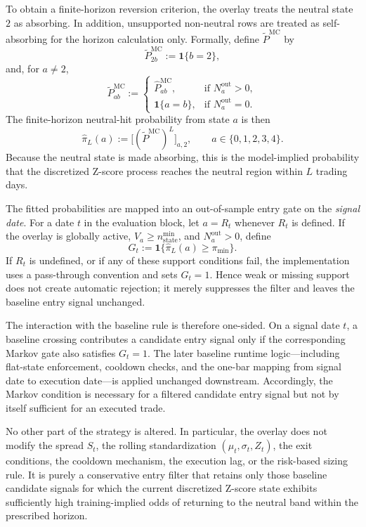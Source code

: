 \documentclass[11pt,a4paper]{article}
\begin{document}
To obtain a finite-horizon reversion criterion, the overlay treats the neutral
state \(2\) as absorbing. In addition, unsupported non-neutral rows are treated
as self-absorbing for the horizon calculation only. Formally, define
\(\widetilde P^{\mathrm{MC}}\) by
\[
  \widetilde P^{\mathrm{MC}}_{2b}
  :=
  \mathbf 1\{b=2\},
\]
and, for \(a \neq 2\),
\[
  \widetilde P^{\mathrm{MC}}_{ab}
  :=
  \begin{cases}
    \widehat P^{\mathrm{MC}}_{ab},
    & \text{if } N_a^{\mathrm{out}} > 0,\\[4pt]
    \mathbf 1\{a=b\},
    & \text{if } N_a^{\mathrm{out}} = 0.
  \end{cases}
\]
The finite-horizon neutral-hit probability from state \(a\) is then
\[
  \widehat \pi_L(a)
  :=
  \bigl[(\widetilde P^{\mathrm{MC}})^L\bigr]_{a,2},
  \qquad a \in \{0,1,2,3,4\}.
\]
Because the neutral state is made absorbing, this is the model-implied
probability that the discretized Z-score process reaches the neutral region
within \(L\) trading days.

The fitted probabilities are mapped into an out-of-sample entry gate on the
\emph{signal date}. For a date \(t\) in the evaluation block, let \(a=R_t\)
whenever \(R_t\) is defined. If the overlay is globally active,
\(V_a \ge n_{\mathrm{state}}^{\min}\), and \(N_a^{\mathrm{out}}>0\), define
\[
  G_t
  :=
  \mathbf 1\{\widehat \pi_L(a) \ge \pi_{\min}\}.
\]
If \(R_t\) is undefined, or if any of these support conditions fail, the
implementation uses a pass-through convention and sets \(G_t=1\). Hence weak or
missing support does not create automatic rejection; it merely suppresses the
filter and leaves the baseline entry signal unchanged.

The interaction with the baseline rule is therefore one-sided. On a signal date
\(t\), a baseline crossing contributes a candidate entry signal only if the
corresponding Markov gate also satisfies \(G_t=1\). The later baseline runtime
logic---including flat-state enforcement, cooldown checks, and the one-bar
mapping from signal date to execution date---is applied unchanged downstream.
Accordingly, the Markov condition is necessary for a filtered candidate entry
signal but not by itself sufficient for an executed trade.

No other part of the strategy is altered. In particular, the overlay does not
modify the spread \(S_t\), the rolling standardization
\((\mu_t,\sigma_t,Z_t)\), the exit conditions, the cooldown mechanism, the
execution lag, or the risk-based sizing rule. It is purely a conservative entry
filter that retains only those baseline candidate signals for which the current
discretized Z-score state exhibits sufficiently high training-implied odds of
returning to the neutral band within the prescribed horizon.
\end{document}
